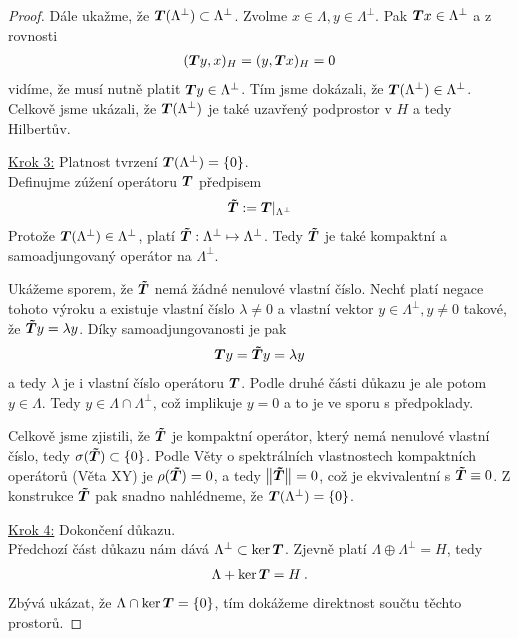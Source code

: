\begin{proof}
Dále ukažme, že $\boldsymbol{T}(\Lambda^\bot) \subset \Lambda^\bot$. Zvolme $x \in \Lambda, y \in \Lambda^\bot$. Pak $\boldsymbol{T} x \in \Lambda^\bot$ a z rovnosti \begin{align*}
    (\boldsymbol{T} y,x)_H = (y, \boldsymbol{T} x)_H =0
\end{align*}
vidíme, že musí nutně platit $\boldsymbol{T} y \in \Lambda^\bot$. Tím jsme dokázali, že $\boldsymbol{T}(\Lambda^\bot) \in \Lambda^{\bot}$. Celkově jsme ukázali, že  $\boldsymbol{T}(\Lambda^\bot)$ je také uzavřený podprostor v $H$ a tedy Hilbertův.

\underline{Krok 3:} Platnost tvrzení $\boldsymbol{T}(\Lambda^\bot) = \lbrace 0 \rbrace$. \\
Definujme zúžení operátoru $\boldsymbol{T}$ předpisem \begin{align*}
    \boldsymbol{\tilde T} := \boldsymbol{T}\rvert_{\Lambda^\bot}
\end{align*}
Protože $\boldsymbol{T}(\Lambda^\bot) \in \Lambda^{\bot}$, platí $\boldsymbol{\tilde T} : \Lambda^{\bot} \mapsto \Lambda^{\bot}$. Tedy $\boldsymbol{\tilde T}$ je také kompaktní a samoadjungovaný operátor na $\Lambda^{\bot}$.

Ukážeme sporem, že $\boldsymbol{\tilde T}$ nemá žádné nenulové vlastní číslo. Nechť platí negace tohoto výroku a existuje vlastní číslo $\lambda \neq 0$ a vlastní vektor $y \in \Lambda^{\bot} , y \neq 0$ takové, že $ \boldsymbol{\tilde T} y = \lambda y$. Díky samoadjungovanosti je pak \begin{align*}
    \boldsymbol{T} y = \boldsymbol{\tilde T} y = \lambda y
\end{align*}
a tedy $\lambda$ je i vlastní číslo operátoru $\boldsymbol{T}$. Podle druhé části důkazu je ale potom $y \in \Lambda$. Tedy $y \in \Lambda \cap \Lambda^\bot$, což implikuje $y=0$ a to je ve sporu s předpoklady.

Celkově jsme zjistili, že $\boldsymbol{\tilde T}$ je kompaktní operátor, který nemá nenulové vlastní číslo, tedy $\sigma(\boldsymbol{\tilde T}) \subset \{ 0 \}$. Podle Věty o spektrálních vlastnostech kompaktních operátorů (Věta XY) je $\rho(\boldsymbol{\tilde T}) = 0$, a tedy  $\left\lVert\boldsymbol{\tilde T}\right\rVert =0$, což je ekvivalentní s $\boldsymbol{\tilde T} \equiv 0$. Z konstrukce $\boldsymbol{\tilde T}$ pak snadno nahlédneme, že $\boldsymbol{T}(\Lambda^\bot)= \{0 \}$.

\underline{Krok 4:} Dokončení důkazu. \\
Předchozí část důkazu nám dává $\Lambda^\bot \subset \mathrm{ker}\, \boldsymbol{T}$. Zjevně platí $\Lambda \oplus \Lambda^\bot = H$, tedy \begin{align*}
    \Lambda + \mathrm{ker}\, \boldsymbol{T} = H \:.
\end{align*}
Zbývá ukázat, že $\Lambda \cap \mathrm{ker}\, \boldsymbol{T} = \{0 \}$, tím dokážeme direktnost součtu těchto prostorů.


\end{proof}
